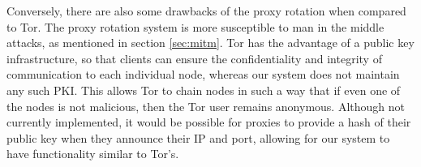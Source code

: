 Conversely, there are also some drawbacks of the proxy rotation when compared to Tor. The proxy rotation system is more susceptible to man in the middle attacks, as mentioned in section \ref{sec:mitm}. Tor has the advantage of a public key infrastructure, so that clients can ensure the confidentiality and integrity of communication to each individual node, whereas our system does not maintain any such PKI. This allows Tor to chain nodes in such a way that if even one of the nodes is not malicious, then the Tor user remains anonymous. Although not currently implemented, it would be possible for proxies to provide a hash of their public key when they announce their IP and port, allowing for our system to have functionality similar to Tor's.
